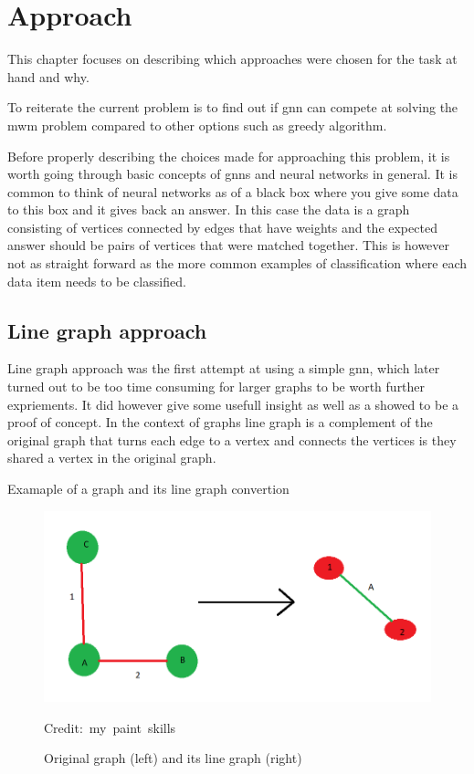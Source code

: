 \chapter{Approach}

This chapter focuses on describing which approaches were chosen for the task at hand and why. 

To reiterate the current problem is to find out if \gls{gnn} can compete at solving the \gls{mwm} problem compared to other options such as greedy algorithm.

Before properly describing the choices made for approaching this problem, it is worth going through basic concepts of \gls{gnn}s and neural networks in general. It is common to think of neural networks as of a black box where you give some data to this box and it gives back an answer. In this case the data is a graph consisting of vertices connected by edges that have weights and the expected answer should be pairs of vertices that were matched together. This is however not as straight forward as the more common examples of classification where each data item needs to be classified.  

\section{Line graph approach}

Line graph approach was the first attempt at using a simple \gls{gnn}, which later turned out to be too time consuming for larger graphs to be worth further expriements. It did however give some usefull insight as well as a showed to be a proof of concept. In the context of graphs line graph is a complement of the original graph that turns each edge to a vertex and connects the vertices is they shared a vertex in the original graph. 

Examaple of a graph and its line graph convertion
\begin{figure}[H]
    \centering
    \includegraphics[scale=0.5]{figures/LineGraphExample}
    \caption{Original graph (left) and its line graph (right)}
  	\medskip 
	\hspace*{15pt}\hbox{\scriptsize Credit: my paint skills}
    \label{Line graph figure}
\end{figure}


